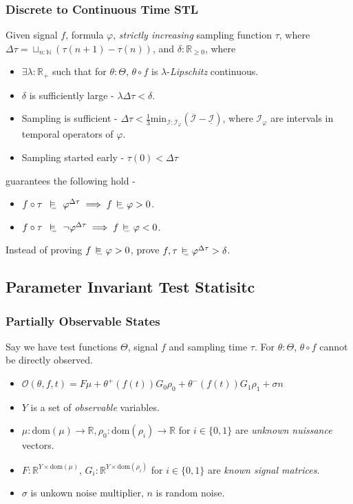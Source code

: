 \documentclass{beamer}
\newcommand{\typeTime}{\mathbb{R}_{\geq 0}}
\newcommand{\typeReal}{\mathbb{R}}
\newcommand{\typeNat}{\mathbb{N}}
\newcommand{\dom}{\text{dom}}
\newcommand{\interval}{\mathcal{I}}
\newcommand{\observe}{\mathcal{O}}
\newcommand{\discrete}{\raisebox{-0.1ex}{\scalebox{0.25}{\textrm{DSC}}}}
\newcommand{\cont}{\raisebox{-0.1ex}{\scalebox{0.25}{\textrm{CNT}}}}
\newcommand{\discreteSatisfy}{\ \stackMath\stackunder[0pt]{\vDash}{\hspace*{0.3em}\discrete}\ }
\newcommand{\contSatisfy}{\ \stackMath\stackunder[0pt]{\vDash}{\hspace*{0.3em}\cont}\ }
\begin{document}
\begin{frame}
    \frametitle{Discrete to Continuous Time STL}
    Given signal $f$, formula $\varphi$, \textit{strictly increasing} sampling function
    $\tau$, where $\Delta \tau = \sqcup_{n : \typeNat}(\tau(n+1) - \tau(n))$,
    and $\delta : \typeTime$, where
    \begin{itemize}
        \item $\exists \lambda:\typeReal_{+}$ such
            that for $\theta : \Theta$, $\theta \circ f$ is
            $\lambda$-\textit{Lipschitz} continuous.
        \item $\delta$ is sufficiently large - $\lambda \Delta\tau < \delta$.
        \item Sampling is sufficient - $\Delta\tau < \frac{1}{3}
            \text{min}_{\interval:\interval_{\varphi}}(\overline{\interval} -
            \underline{\interval})$, where $\interval_{\varphi}$ are intervals
            in temporal operators of $\varphi$.
        \item Sampling started early - $\tau(0) < \Delta\tau$
    \end{itemize}
    guarantees the following hold -
    \begin{itemize}
        \item $f \circ \tau\ \discreteSatisfy\ \varphi^{\Delta\tau} \implies f
        \contSatisfy \varphi > 0 $.
        \item $f \circ \tau\ \discreteSatisfy\ \neg\varphi^{\Delta\tau} \implies f
        \contSatisfy \varphi < 0 $.
    \end{itemize}
    Instead of proving $f \contSatisfy \varphi > 0 $, prove
    $f, \tau \discreteSatisfy \varphi^{\Delta\tau} > \delta$.
\end{frame}

\subsection{Parameter Invariant Test Statisitc}

\begin{frame}
    \frametitle{Partially Observable States}
    Say we have test functions $\Theta$, signal $f$
    and sampling time $\tau$. For $\theta : \Theta$, $\theta \circ f$ cannot
    be directly observed.
    \begin{itemize}
        \item $\observe(\theta, f, t) = F\mu + \theta^+(f(t))G_0\rho_0
                + \theta^{-}(f(t))G_1\rho_1 + \sigma n$
        \item $Y$ is a set of \textit{observable} variables.
        \item $\mu : \dom(\mu) \to \typeReal, \rho_0 : \dom(\rho_i) \to
            \typeReal$ for $i \in \{0, 1\}$ are \textit{unknown nuissance} vectors.
        \item $F : \typeReal^{Y \times \dom(\mu)}$,
            $G_i : \typeReal^{Y \times \dom(\rho_i)}$ for $i \in \{0, 1\}$ are
            \textit{known signal matrices}.
        \item $\sigma$ is unkown noise multiplier, $n$ is random noise.
    \end{itemize}
\end{frame}
\end{document}
